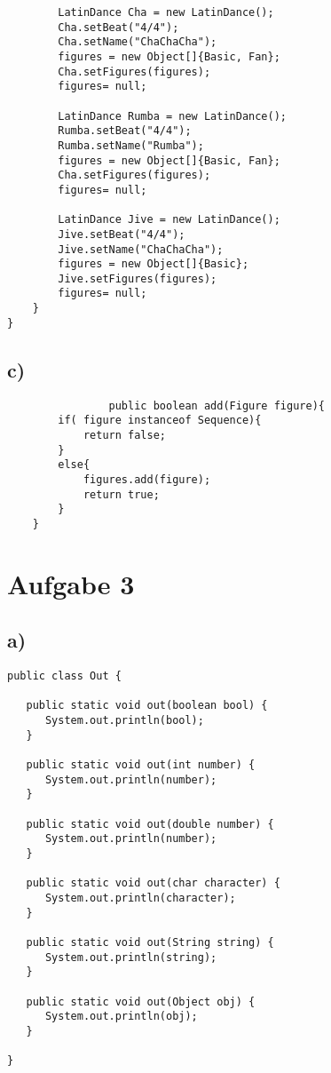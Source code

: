 \documentclass[12pt,a4paper,oneside,ngerman]{article}
\begin{document}
\begin{verbatim}
        LatinDance Cha = new LatinDance();
        Cha.setBeat("4/4");
        Cha.setName("ChaChaCha");
        figures = new Object[]{Basic, Fan};
        Cha.setFigures(figures);
        figures= null;

        LatinDance Rumba = new LatinDance();
        Rumba.setBeat("4/4");
        Rumba.setName("Rumba");
        figures = new Object[]{Basic, Fan};
        Cha.setFigures(figures);
        figures= null;

        LatinDance Jive = new LatinDance();
        Jive.setBeat("4/4");
        Jive.setName("ChaChaCha");
        figures = new Object[]{Basic};
        Jive.setFigures(figures);
        figures= null;
    }
}

					\end{verbatim}
			\subsection{c)}
			\begin{verbatim}
				public boolean add(Figure figure){
        if( figure instanceof Sequence){
            return false;
        }
        else{
            figures.add(figure);
            return true;
        }
    }
			\end{verbatim}
	\section{Aufgabe 3}
			\subsection{a)}

\begin{lstlisting}
public class Out {

   public static void out(boolean bool) {
      System.out.println(bool);
   }

   public static void out(int number) {
      System.out.println(number);
   }

   public static void out(double number) {
      System.out.println(number);
   }

   public static void out(char character) {
      System.out.println(character);
   }

   public static void out(String string) {
      System.out.println(string);
   }

   public static void out(Object obj) {
      System.out.println(obj);
   }

}
\end{lstlisting}
\end{document}
